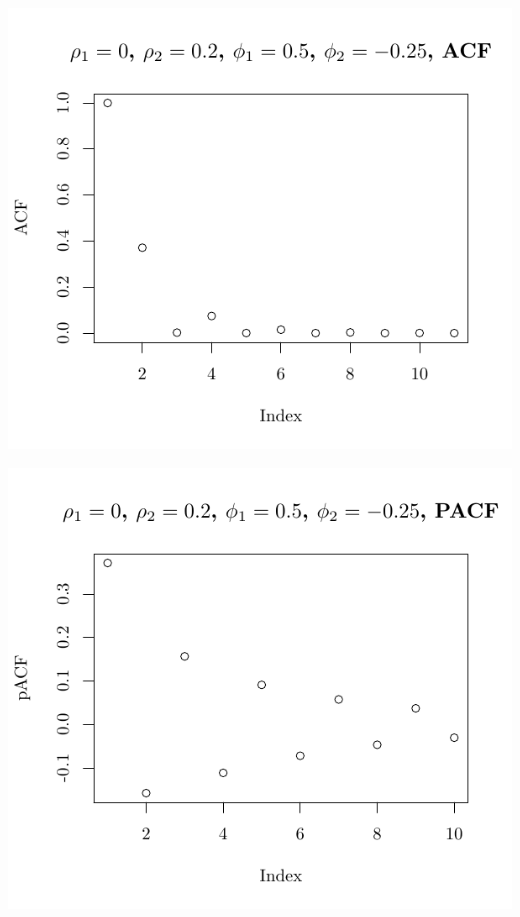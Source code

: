 \documentclass[10pt]{paper}\usepackage[]{graphicx}\usepackage[]{color}
\makeatletter
\def\maxwidth{ %
  \ifdim\Gin@nat@width>\linewidth
    \linewidth
  \else
    \Gin@nat@width
  \fi
}
\newenvironment{knitrout}{}{} %
\makeatother
\begin{document}
\begin{knitrout}
{\centering \includegraphics[width=\maxwidth]{figure/graphics-plotter-93} 

}




{\centering \includegraphics[width=\maxwidth]{figure/graphics-plotter-94} 

}





\end{knitrout}
\end{document}
